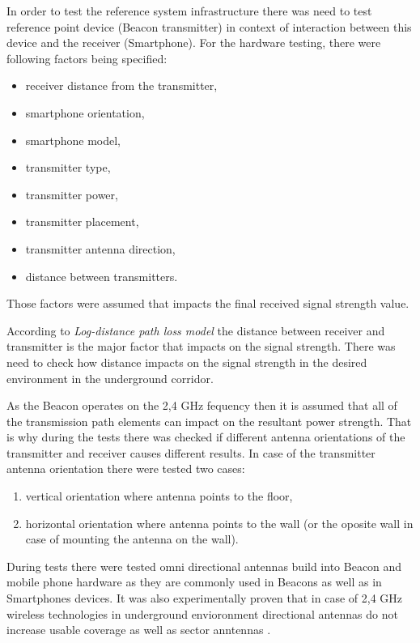 \documentclass[../main.tex]{subfiles}
\begin{document}
In order to test the reference system infrastructure there was need to test reference point device (Beacon transmitter) in context of interaction between this device and the receiver (Smartphone). For the hardware testing, there were following factors being specified:
\begin{itemize}
	\item receiver distance from the transmitter,
	\item smartphone orientation,
	\item smartphone model,
	\item transmitter type,
	\item transmitter power,
	\item transmitter placement,
	\item transmitter antenna direction,
	\item distance between transmitters.
\end{itemize}

Those factors were assumed that impacts the final received signal strength value.

According to \textit{Log-distance path loss model} \cite{RSSI_path_loss_prediction_model} the distance between receiver and transmitter is the major factor that impacts on the signal strength. There was need to check how distance impacts on the signal strength in the desired environment in the underground corridor.

As the Beacon operates on the 2,4 GHz fequency then it is assumed that all of the transmission path elements can impact on the resultant power strength. That is why during the tests there was checked if different antenna orientations of the transmitter and  receiver causes different results. In case of the transmitter antenna orientation there were tested two cases:
\begin{enumerate}
	\item vertical orientation where antenna points to the floor,
	\item horizontal orientation where antenna points to the wall (or the oposite wall in case of mounting the antenna on the wall).
\end{enumerate}

During tests there were tested omni directional antennas build into Beacon and mobile phone hardware as they are commonly used in Beacons as well as in Smartphones devices. It was also experimentally proven that in case of 2,4 GHz wireless technologies in underground envioronment directional antennas do not increase usable coverage as well as sector anntennas \cite{Thesis_CM}.
\end{document}
